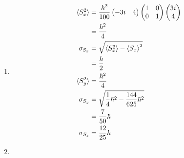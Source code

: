 \documentclass{article}
\begin{document}
\begin{enumerate}
  \item

        \begin{align*}
          \braket{S_x^2} & = \frac{\hbar^2}{100} \begin{pmatrix}
                                                   -3 i & 4
                                                 \end{pmatrix} \begin{pmatrix}
                                                                 1 & 0 \\
                                                                 0 & 1
                                                               \end{pmatrix} \begin{pmatrix}
                                                                               3 i \\
                                                                               4
                                                                             \end{pmatrix} \\
                         & = \frac{\hbar^2}{4}                                              \\
          \sigma_{S_x}   & = \sqrt{\braket{S_x^2} - \braket{S_x}^2}                         \\
                         & = \frac{\hbar}{2}                                                \\
          \braket{S_y^2} & = \frac{\hbar^2}{4}                                              \\
          \sigma_{S_y}   & = \sqrt{\frac{1}{4} \hbar^2 - \frac{144}{625} \hbar^2}           \\
                         & = \frac{7}{50} \hbar                                             \\
          \sigma_{S_z}   & = \frac{12}{25} \hbar
        \end{align*}

  \item


\end{enumerate}
\end{document}
